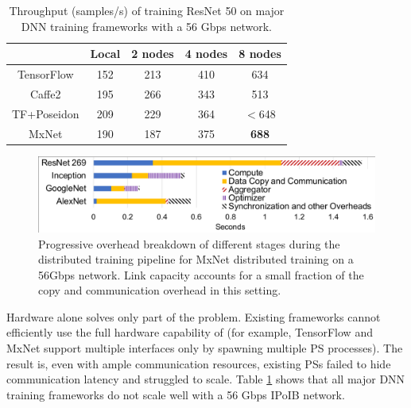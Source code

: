 \section{\phub}

\begin{table}[tb!]
        \centering
        \footnotesize
	\begin{tabular}{|c|c|c|c|c|}
		\hline
		   & Local & 2 nodes & 4 nodes & 8 nodes\\
		\hline 
		TensorFlow   & 152  &  213  & 410    &  634 \\
		\hline
		Caffe2 & 195   &  266  &  343   &   513  \\
		\hline
		TF+Poseidon\cite{poseidon} & 209 & 229  & 364 & $<$648 \\
		\hline
		MxNet & 190  &  187  &  375   &  \textbf{688}  \\
		\hline
	\end{tabular}
	\caption{Throughput (samples/s) of training ResNet 50 on  major DNN training frameworks with a 56 Gbps network.}
	\label{table:frameworkPerf}
\end{table}

\begin{figure}
    \centering
	\includegraphics[width=.7\linewidth,trim=3 2 2 4,clip]{Figures/OverheadBreakdown.pdf}
	\caption{Progressive overhead breakdown of different stages during the distributed training pipeline for MxNet distributed training on a 56Gbps network. Link capacity accounts for a small fraction of the copy and communication overhead in this setting.}
	\label{fig:overheadBreakdown}
\end{figure}

Hardware alone solves only part of the problem. Existing frameworks cannot efficiently use the full hardware capability of \pbox (for example, TensorFlow and MxNet support multiple interfaces only by spawning multiple PS processes). The result is, even with ample communication resources, existing PSs failed to hide communication latency and struggled to scale. Table \ref{table:frameworkPerf} shows that all major DNN training frameworks %
do not scale well with a 56 Gbps IPoIB network.

